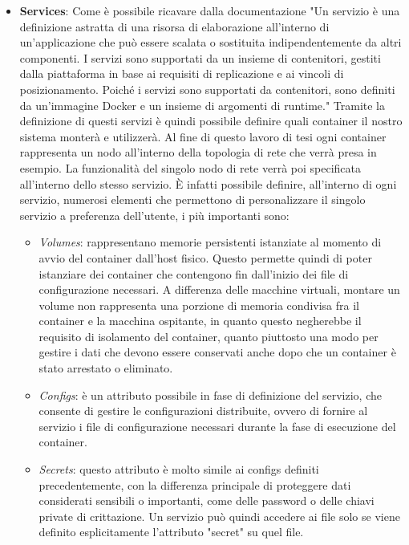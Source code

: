 \begin{itemize}
    \item \textbf{Services}: Come è possibile ricavare dalla documentazione\cite{composeservices} "Un servizio è una definizione astratta di una risorsa di elaborazione all'interno di un'applicazione che può essere scalata o sostituita indipendentemente da altri componenti. 
    I servizi sono supportati da un insieme di contenitori, gestiti dalla piattaforma in base ai requisiti di replicazione e ai vincoli di posizionamento. Poiché i servizi sono supportati da contenitori, sono definiti da un'immagine Docker e un insieme di argomenti di runtime."
    Tramite la definizione di questi servizi è quindi possibile definire quali container il nostro sistema monterà e utilizzerà. Al fine di questo lavoro di tesi ogni container rappresenta un nodo all'interno della topologia di rete che verrà presa in esempio. La funzionalità del
    singolo nodo di rete verrà poi specificata all'interno dello stesso servizio. È infatti possibile definire, all'interno di ogni servizio, numerosi elementi che permettono di personalizzare il singolo servizio a preferenza dell'utente, i più importanti sono:\\

    \begin{itemize}
        \item \textit{Volumes}: rappresentano memorie persistenti istanziate al momento di avvio del container dall'host fisico. Questo permette quindi di poter istanziare dei container che contengono fin dall'inizio dei file di configurazione necessari. A differenza delle macchine virtuali, montare un volume
            non rappresenta una porzione di memoria condivisa fra il container e la macchina ospitante, in quanto questo negherebbe il requisito di isolamento del container, quanto piuttosto una modo per gestire i dati che devono essere conservati anche dopo che un container è stato arrestato o eliminato.
        \item \textit{Configs}: è un attributo possibile in fase di definizione del servizio, che consente di gestire le configurazioni distribuite, ovvero di fornire al servizio i file di configurazione necessari durante la fase di esecuzione del container.  
        \item \textit{Secrets}: questo attributo è molto simile ai configs definiti precedentemente, con la differenza principale di proteggere dati considerati sensibili o importanti, come delle password o delle chiavi private di crittazione. Un servizio può quindi accedere ai file solo se viene definito esplicitamente
            l'attributo "secret" su quel file.
    \end{itemize}


\end{itemize}

